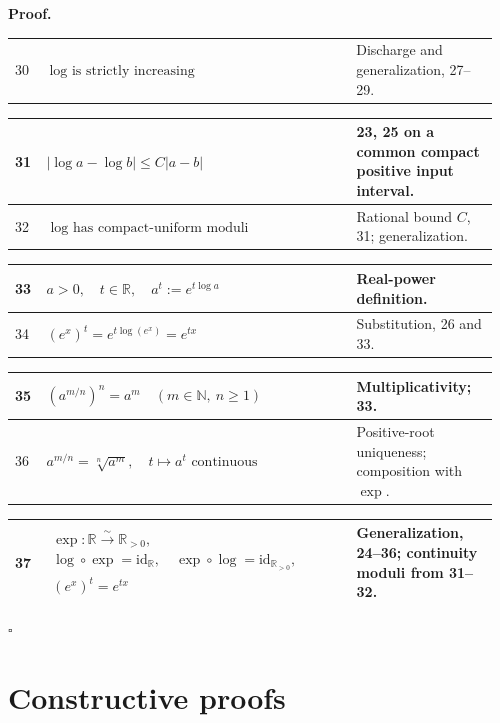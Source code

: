 \documentclass[11pt,reqno]{amsart}
\providecommand{\R}{\mathbb{R}}
\theoremstyle{redplain}
\renewcommand{\qedsymbol}{\textcolor{proofqed}{\ensuremath{\square}}}
\renewenvironment{proof}[1][Proof]{\par\noindent\textbf{\textcolor{proofhead}{#1.}}\par\nobreak}{\par\nobreak\hfill\qedsymbol}
\numberwithin{equation}{section}
\begin{document}
\begin{proof}
\begin{tabular}{|@{}p{0.06\linewidth}p{0.61\linewidth}p{0.29\linewidth}}
30 & $\log\text{ is strictly increasing}$ & Discharge and generalization,
27--29. \\ 
\end{tabular}%
\noindent \text{ \ }\newline
\noindent 
\begin{tabular}{|@{}p{0.06\linewidth}p{0.61\linewidth}p{0.29\linewidth}}
\hline
31 & $|\log a-\log b|\le C|a-b|$ & 23, 25 on a common compact positive input
interval. \\ \hline
32 & $\log\text{ has compact-uniform moduli}$ & Rational bound $C$, 31;
generalization. \\ 
\end{tabular}%
\noindent \text{ \ }\newline
\noindent 
\begin{tabular}{|@{}p{0.06\linewidth}p{0.61\linewidth}p{0.29\linewidth}}
\hline
33 & $a>0,\quad t\in\mathbb{R},\quad a^t:=e^{t\log a}$ & Real-power
definition. \\ \hline
34 & $(e^x)^t=e^{t\log(e^x)}=e^{tx}$ & Substitution, 26 and 33. \\ 
\end{tabular}%
\noindent \text{ \ }\newline
\noindent 
\begin{tabular}{|@{}p{0.06\linewidth}p{0.61\linewidth}p{0.29\linewidth}}
\hline
35 & $(a^{m/n})^n=a^m\quad(m\in\mathbb{N},\ n\ge1)$ & Multiplicativity; 33.
\\ \hline
36 & $a^{m/n}=\sqrt[n]{a^m},\quad t\mapsto a^t\text{ continuous}$ & 
Positive-root uniqueness; composition with $\exp$. \\ 
\end{tabular}%
\noindent \text{ \ }\newline
\noindent 
\begin{tabular}{|@{}p{0.06\linewidth}p{0.61\linewidth}p{0.29\linewidth}}
\hline
37 & $\begin{gathered}\exp:\mathbb R\overset{\sim}{\longrightarrow}\mathbb
R_{>0},\\
\log\circ\exp=\mathrm{id}_{\R},\quad\exp\circ\log=\mathrm{id}_{\R_{>0}},\\
(e^x)^t=e^{tx}\end{gathered}$ & Generalization, 24--36; continuity moduli
from 31--32. \\ \hline
\end{tabular}%

\end{proof}
\section{Constructive proofs}
\end{document}
